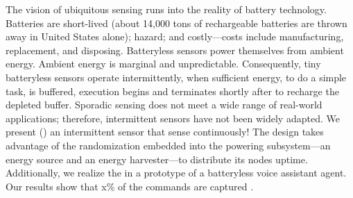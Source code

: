 The vision of ubiquitous sensing runs into the reality of battery technology. Batteries are short-lived (about 14,000 tons of rechargeable batteries are thrown away in United States alone); hazard; and costly---costs include manufacturing, replacement, and disposing. Batteryless sensors power themselves from ambient energy. Ambient energy is marginal and unpredictable. Consequently, tiny batteryless sensors operate intermittently, when sufficient energy, to do a simple task, is buffered, execution begins and terminates shortly after to recharge the depleted buffer. Sporadic sensing does not meet a wide range of real-world applications; therefore, intermittent sensors have not been widely adapted. We present \textit{\fullsys} (\sys) an intermittent sensor that sense continuously! The \sys design takes advantage of the randomization embedded into the powering subsystem---an energy source and an energy harvester---to distribute its nodes uptime. Additionally, we realize the \sys in a prototype of a batteryless voice assistant agent. Our results show that x\% of the commands are captured .
%
%
%
%
